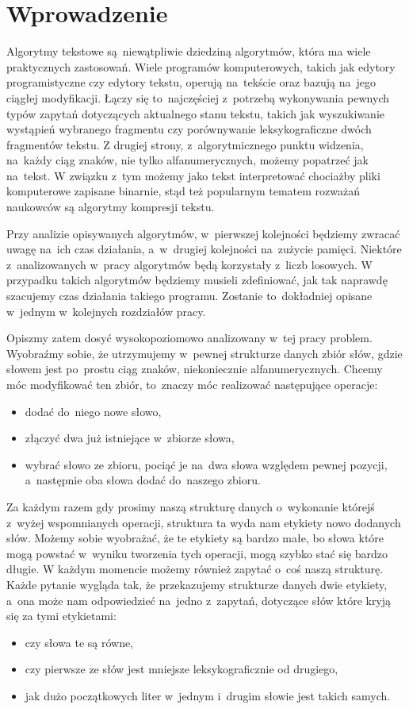 \documentclass[declaration,shortabstract]{iithesis}
\author         {Michał Górniak}
\date          {11 września 2020}
\theoremstyle{definition} \newtheorem{definition}{Definicja}[chapter]
\theoremstyle{remark} \newtheorem{remark}[definition]{Obserwacja}
\theoremstyle{plain} \newtheorem{theorem}[definition]{Twierdzenie}
\theoremstyle{remark} \newtheorem{example}{Przykład}[definition]
\theoremstyle{plain} \newtheorem{lemma}[definition]{Lemat}
\begin{document}
\chapter{Wprowadzenie}

Algorytmy tekstowe są~niewątpliwie dziedziną algorytmów, która ma wiele praktycznych zastosowań. Wiele programów komputerowych, takich jak edytory programistyczne czy edytory tekstu, operują na~tekście oraz bazują na~jego ciągłej modyfikacji. Łączy się to~najczęściej z~potrzebą wykonywania pewnych typów zapytań dotyczących aktualnego stanu tekstu, takich jak wyszukiwanie wystąpień wybranego fragmentu czy porównywanie leksykograficzne dwóch fragmentów tekstu. Z drugiej strony, z~algorytmicznego punktu widzenia, na~każdy ciąg znaków, nie tylko alfanumerycznych, możemy popatrzeć jak na~tekst. W związku z~tym możemy jako tekst interpretować chociażby pliki komputerowe zapisane binarnie, stąd też popularnym tematem rozważań naukowców są algorytmy kompresji tekstu.

Przy analizie opisywanych algorytmów, w~pierwszej kolejności będziemy zwracać uwagę na~ich czas działania, a~w~drugiej kolejności na~zużycie pamięci. Niektóre z~analizowanych w~pracy algorytmów będą korzystały z~liczb losowych. W przypadku takich algorytmów będziemy musieli zdefiniować, jak tak naprawdę szacujemy czas działania takiego programu. Zostanie to~dokładniej opisane w~jednym w~kolejnych rozdziałów pracy.

Opiszmy zatem dosyć wysokopoziomowo analizowany w~tej pracy problem. Wyobraźmy sobie, że utrzymujemy w~pewnej strukturze danych zbiór słów, gdzie słowem jest po~prostu ciąg znaków, niekoniecznie alfanumerycznych. Chcemy móc modyfikować ten zbiór, to~znaczy móc realizować następujące operacje: 
\begin{itemize}
    \item dodać do~niego nowe słowo, 
    \item złączyć dwa już istniejące w~zbiorze słowa,
    \item wybrać słowo ze zbioru, pociąć je na~dwa słowa względem pewnej pozycji, a~następnie oba słowa dodać do~naszego zbioru. 
\end{itemize}
Za każdym razem gdy prosimy naszą strukturę danych o~wykonanie którejś z~wyżej wspomnianych operacji, struktura ta wyda nam etykiety nowo dodanych słów. Możemy sobie wyobrażać, że te etykiety są bardzo małe, bo słowa które mogą powstać w~wyniku tworzenia tych operacji, mogą szybko stać się bardzo długie. W każdym momencie możemy również zapytać o~coś naszą strukturę. Każde pytanie wygląda tak, że przekazujemy strukturze danych dwie etykiety, a~ona może nam odpowiedzieć na~jedno z~zapytań, dotyczące słów które kryją się za tymi etykietami:
\begin{itemize}
    \item czy słowa te są równe,
    \item czy pierwsze ze słów jest mniejsze leksykograficznie od drugiego,
    \item jak dużo początkowych liter w~jednym i~drugim słowie jest takich samych.
\end{itemize}
\end{document}

